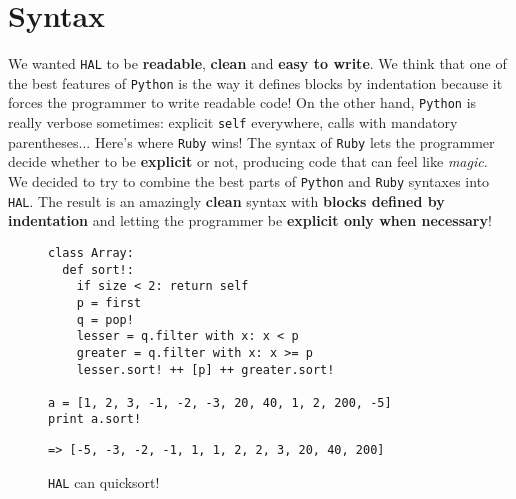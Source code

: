 \documentclass[a4paper,11pt]{article}
\begin{document}
\section{Syntax}
We wanted \texttt{HAL} to be \textbf{readable}, \textbf{clean} and \textbf{easy to write}. We think that one of the
    best features of \texttt{Python} is the way it defines blocks by indentation because it forces the programmer
    to write readable code! On the other hand, \texttt{Python} is really verbose sometimes: explicit \texttt{self} everywhere,
    calls with mandatory parentheses... Here's where \texttt{Ruby} wins! The syntax of \texttt{Ruby} lets the programmer
    decide whether to be \textbf{explicit} or not, producing code that can feel like \emph{magic}.
\\
We decided to try to combine the best parts of \texttt{Python} and \texttt{Ruby} syntaxes into \texttt{HAL}. The result
    is an amazingly \textbf{clean} syntax with \textbf{blocks defined by indentation} and letting the programmer
    be \textbf{explicit only when necessary}!
\begin{figure}[h!]
\begin{lstlisting}[language=hal]
class Array:
  def sort!:
    if size < 2: return self
    p = first
    q = pop!
    lesser = q.filter with x: x < p
    greater = q.filter with x: x >= p
    lesser.sort! ++ [p] ++ greater.sort!

a = [1, 2, 3, -1, -2, -3, 20, 40, 1, 2, 200, -5]
print a.sort!
\end{lstlisting}
\begin{verbatim}
=> [-5, -3, -2, -1, 1, 1, 2, 2, 3, 20, 40, 200]
\end{verbatim}
\caption{\texttt{HAL} can quicksort!}
\end{figure}
\end{document}
